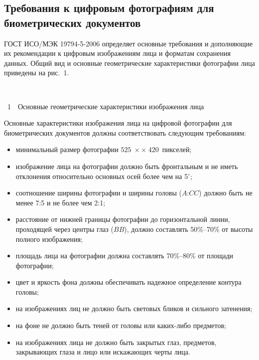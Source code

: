 \begin{multicols}{2}
{}

\section{Требования к цифровым фотографиям для биометрических документов}

ГОСТ ИСО/МЭК 19794-5-2006 определяет основные требования и дополняющие их рекомендации к цифровым изображениям 
лица и форматам сохранения данных. Общий вид и основные геометрические характеристики фотографии лица приведены на 
рис.~1.

\begin{center} %
\vspace*{18pt}
\mbox{%
\epsfxsize=68.242mm
}
\end{center}
\vspace*{6pt}
{{\figurename~1}\ \ \small{Основные геометрические характеристики изображения лица}}


\bigskip
\addtocounter{figure}{1}

Основные характеристики изображения лица на цифровой фотографии для биометрических документов должны соответствовать 
следующим требованиям:
\begin{itemize}
\item минимальный размер фотографии \mbox{$525\;\times$}\linebreak $\times\;420$~пикселей;
\item изображение лица на фотографии должно быть фронтальным и не иметь отклонения относительно основных осей более чем 
на 5$^\circ$;
\item соотношение ширины фотографии и ширины головы ($A$:$CC$) должно быть не менее 7:5 и не более чем 2:1;
\item расстояние от нижней границы фотографии до горизонтальной линии, проходящей через центры глаз ($BB$), должно 
составлять 50\%--70\% от высоты полного изображения;
\item площадь лица на фотографии должна со\-став\-лять 70\%--80\% от площади фотографии;
\item цвет и яркость фона должны обеспечивать надежное определение контура головы;
\item на изображениях лиц не должно быть световых бликов и сильного затенения;
\item на фоне не должно быть теней от головы или каких-либо предметов;
\item на изображениях лица не должно быть закрытых глаз, предметов, закрывающих глаза и лицо или искажающих черты лица.
\end{itemize}


\end{multicols}
